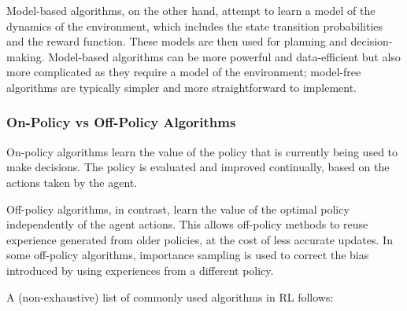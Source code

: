 Model-based algorithms, on the other hand, attempt to learn a model of the dynamics of the environment, which includes the state transition probabilities and the reward function.
These models are then used for planning and decision-making.
Model-based algorithms can be more powerful and data-efficient but also more complicated as they require a model of the environment; model-free algorithms are typically simpler and more straightforward to implement.

\subsubsection{On-Policy vs Off-Policy Algorithms}

On-policy algorithms learn the value of the policy that is currently being used to make decisions. 
The policy is evaluated and improved continually, based on the actions taken by the agent.

Off-policy algorithms, in contrast, learn the value of the optimal policy independently of the agent actions.
This allows off-policy methods to reuse experience generated from older policies, at the cost of less accurate updates.
In some off-policy algorithms, importance sampling is used to correct the bias introduced by using experiences from a different policy.

A (non-exhaustive) list of commonly used algorithms in RL follows:

